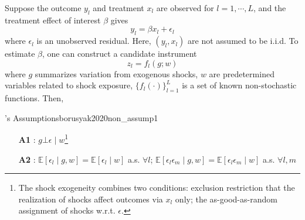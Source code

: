 \documentclass[twoside]{article}
\begin{document}
Suppose the outcome $y_l$ and treatment $x_l$ are observed for $l=1,\cdots,L$, and the treatment effect of interest $\beta$ gives $$ y_l = \beta x_l + \epsilon_l $$
where $\epsilon_l$ is an unobserved residual. Here, $\left(y_l,x_l\right)$ are not assumed to be i.i.d. To estimate $\beta$, one can construct a candidate instrument $$z_l = f_l(g;w)$$
where $g$ summarizes variation from exogenous shocks, $w$ are predetermined variables related to shock exposure, $\{f_l(\cdot)\}^L_{l=1}$ is a set of known non-stochastic functions. Then, 
\begin{assumption}{\citet{borusyak2020non}'s Assumptions}{borusyak2020non_assump1}
    \begin{itemize}
        \item[\textbf{A1}] : $g\bot \epsilon\mid w$\footnote{The shock exogeneity combines two conditions: exclusion restriction that the realization of shocks affect outcomes via $x_l$ only; the as-good-as-random assignment of shocks w.r.t. $\epsilon$.}
        \item[\textbf{A2}] : $\mathbb{E}\left[\epsilon_l\mid g,w\right]=\mathbb{E}\left[\epsilon_l\mid w\right]$ a.s. $\forall l$; $\mathbb{E}\left[\epsilon_l\epsilon_m\mid g,w\right] = \mathbb{E}\left[\epsilon_l\epsilon_m\mid w\right]$ a.s. $\forall l,m$
    \end{itemize}
\end{assumption}
\end{document}
